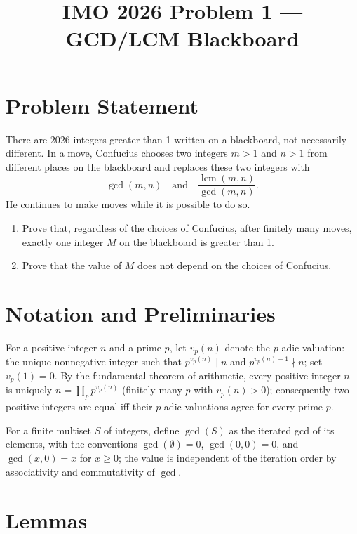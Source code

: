 \documentclass{article}
\DeclareMathOperator{\lcm}{lcm}
\begin{document}
\title{IMO 2026 Problem 1 --- GCD/LCM Blackboard}
\author{}
\date{}
\maketitle

\section*{Problem Statement}

There are 2026 integers greater than 1 written on a blackboard, not necessarily different.
In a move, Confucius chooses two integers $m>1$ and $n>1$ from different places on the blackboard
and replaces these two integers with
\[
\gcd(m,n) \quad\text{and}\quad \frac{\lcm(m,n)}{\gcd(m,n)}.
\]
He continues to make moves while it is possible to do so.

\begin{enumerate}
\item[(a)] Prove that, regardless of the choices of Confucius, after finitely many moves,
           exactly one integer $M$ on the blackboard is greater than 1.
\item[(b)] Prove that the value of $M$ does not depend on the choices of Confucius.
\end{enumerate}

\section{Notation and Preliminaries}

For a positive integer $n$ and a prime $p$, let $v_p(n)$ denote the $p$-adic valuation:
the unique nonnegative integer such that $p^{v_p(n)}\mid n$ and $p^{v_p(n)+1}\nmid n$;
set $v_p(1)=0$. By the fundamental theorem of arithmetic, every positive integer $n$ is
uniquely $n=\prod_p p^{v_p(n)}$ (finitely many $p$ with $v_p(n)>0$); consequently two
positive integers are equal iff their $p$-adic valuations agree for every prime $p$.

For a finite multiset $S$ of integers, define $\gcd(S)$ as the iterated gcd of its elements,
with the conventions $\gcd(\emptyset)=0$, $\gcd(0,0)=0$, and $\gcd(x,0)=x$ for $x\geq 0$;
the value is independent of the iteration order by associativity and commutativity of $\gcd$.

\section{Lemmas}
\end{document}
